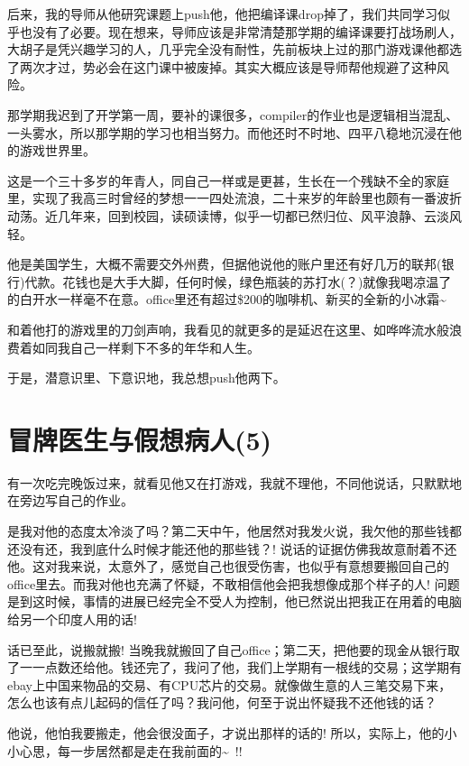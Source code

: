\documentclass[12pt]{book}
\begin{document}
后来，我的导师从他研究课题上push他，他把编译课drop掉了，我们共同学习似乎也没有了必要。现在想来，导师应该是非常清楚那学期的编译课要打战场刷人，大胡子是凭兴趣学习的人，几乎完全没有耐性，先前板块上过的那门游戏课他都选了两次才过，势必会在这门课中被废掉。其实大概应该是导师帮他规避了这种风险。

那学期我迟到了开学第一周，要补的课很多，compiler的作业也是逻辑相当混乱、一头雾水，所以那学期的学习也相当努力。而他还时不时地、四平八稳地沉浸在他的游戏世界里。

这是一个三十多岁的年青人，同自己一样或是更甚，生长在一个残缺不全的家庭里，实现了我高三时曾经的梦想一一四处流浪，二十来岁的年龄里也颇有一番波折动荡。近几年来，回到校园，读硕读博，似乎一切都已然归位、风平浪静、云淡风轻。

他是美国学生，大概不需要交外州费，但据他说他的账户里还有好几万的联邦(银行)代款。花钱也是大手大脚，任何时候，绿色瓶装的苏打水(？)就像我喝凉温了的白开水一样毫不在意。office里还有超过\$200的咖啡机、新买的全新的小冰霜\textasciitilde{}~

和着他打的游戏里的刀剑声响，我看见的就更多的是延迟在这里、如哗哗流水般浪费着如同我自己一样剩下不多的年华和人生。

于是，潜意识里、下意识地，我总想push他两下。

\section{冒牌医生与假想病人(5)}
\label{sec-18-5}

有一次吃完晚饭过来，就看见他又在打游戏，我就不理他，不同他说话，只默默地在旁边写自己的作业。

是我对他的态度太冷淡了吗？第二天中午，他居然对我发火说，我欠他的那些钱都还没有还，我到底什么时候才能还他的那些钱？! 说话的证据仿佛我故意耐着不还他。这对我来说，太意外了，感觉自己也很受伤害，也似乎有意想要搬回自己的office里去。而我对他也充满了怀疑，不敢相信他会把我想像成那个样子的人! 问题是到这时候，事情的进展已经完全不受人为控制，他已然说出把我正在用着的电脑给另一个印度人用的话!

话已至此，说搬就搬! 当晚我就搬回了自己office；第二天，把他要的现金从银行取了一一点数还给他。钱还完了，我问了他，我们上学期有一根线的交易；这学期有ebay上中国来物品的交易、有CPU芯片的交易。就像做生意的人三笔交易下来，怎么也该有点儿起码的信任了吗？我问他，何至于说出怀疑我不还他钱的话？

他说，他怕我要搬走，他会很没面子，才说出那样的话的! 所以，实际上，他的小小心思，每一步居然都是走在我前面的\textasciitilde{}~!!
\end{document}
